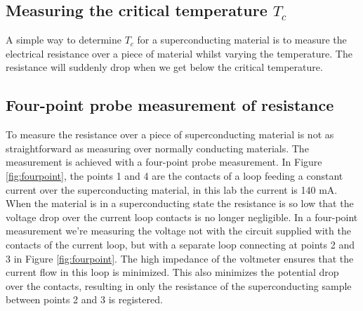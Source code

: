 \documentclass[a4paper,twoside=false,abstract=false,numbers=noenddot,
titlepage=false,headings=small,parskip=half,version=last]{scrartcl}
\begin{document}

\subsection{Measuring the critical temperature $T_c$}
A simple way to determine $T_c$ for a superconducting material is to measure
the electrical resistance over a piece of material whilst varying the
temperature.
The resistance will suddenly drop when we get below the critical temperature.

\subsection{Four-point probe measurement of resistance}
To measure the resistance over a piece of superconducting material is not as straightforward as measuring over normally conducting materials. The measurement is achieved with a four-point probe measurement.
In Figure \ref{fig:fourpoint}, the points 1 and 4 are the contacts of a loop feeding a constant current over the superconducting material, in this lab the current is 140 mA.
When the material is in a superconducting state the resistance is so low that the voltage drop over the current loop contacts is no longer negligible.
In a four-point measurement we're measuring the voltage not with the circuit supplied with the contacts of the current loop, but with a separate loop connecting at points 2 and 3 in Figure \ref{fig:fourpoint}.
The high impedance of the voltmeter ensures that the current flow in this loop is minimized.
This also minimizes the potential drop over the contacts, resulting in only the resistance of the superconducting sample between points 2 and 3 is registered. 
\end{document}
